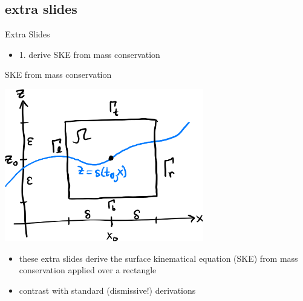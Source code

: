 \documentclass[10pt,dvipsnames]{beamer}
\begin{document}
\subsection[]{extra slides}


\begin{frame}[standout]
Extra Slides

\begin{itemize}
\item 1. derive SKE from mass conservation
\end{itemize}
\end{frame}

\begin{frame}{SKE from mass conservation}
\begin{center}
\includegraphics[width=0.65\textwidth]{skederive.png}
\end{center}

\begin{itemize}
\item these extra slides derive the surface kinematical equation (SKE) from mass conservation applied over a rectangle
\item contrast with standard (dismissive!) derivations \cite{GreveBlatter2009,SchoofHewitt2013}
\end{itemize}
\end{frame}
\end{document}
